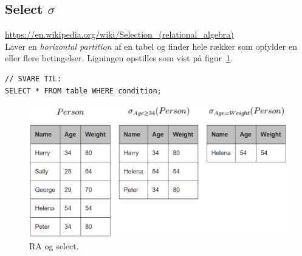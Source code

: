 \subsection{Select $\sigma$}

\url{https://en.wikipedia.org/wiki/Selection_(relational_algebra)}\\

Laver en \textit{horizontal partition} af en tabel og finder hele rækker som opfylder en eller flere betingelser. Ligningen opstilles som vist på figur~\ref{fig:select}.

\begin{lstlisting}[morekeywords={SELECT, FROM, WHERE}]
// SVARE TIL:
SELECT * FROM table WHERE condition;
\end{lstlisting}

\begin{figure}[H]
	\centering
	\includegraphics[width=0.8\linewidth]{figs/spm6/select}
	\caption{RA og select.}
	\label{fig:select}
\end{figure}

%
%
%
%
%
%
